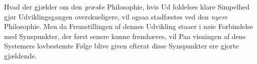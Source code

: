 Hvad der gjælder om den \emph{græske} Philosophie, hvis Ud\-%
foldelses klare Simpelhed gjør Udviklingsgangen overskueligere,
 vil ogsaa stadfæstes ved den \emph{nyere} Philosophie. Men da
Fremstillingen af dennes Udvikling staaer i nøie Forbindelse
med Synspunkter, der først senere kunne fremhæves, vil Paa\-%
visningen af dens Systemers lovbestemte Følge blive given
efterat disse Synspunkter ere gjorte gjældende.

\divrule

